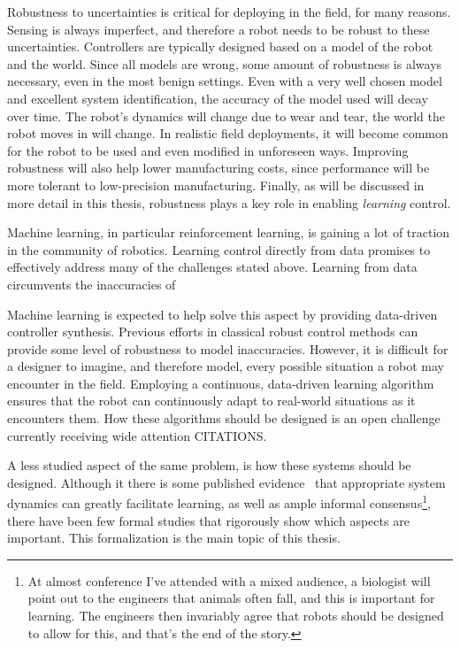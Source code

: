 Robustness to uncertainties is critical for deploying in the field, for many reasons.
Sensing is always imperfect, and therefore a robot needs to be robust to these uncertainties.
Controllers are typically designed based on a model of the robot and the world. Since all models are wrong, some amount of robustness is always necessary, even in the most benign settings.
Even with a very well chosen model and excellent system identification, the accuracy of the model used will decay over time.
The robot's dynamics will change due to wear and tear, the world the robot moves in will change.
In realistic field deployments, it will become common for the robot to be used and even modified in unforeseen ways.
Improving robustness will also help lower manufacturing costs, since performance will be more tolerant to low-precision manufacturing.
Finally, as will be discussed in more detail in this thesis, robustness plays a key role in enabling \emph{learning} control.


\par

Machine learning, in particular reinforcement learning, is gaining a lot of traction in the community of robotics. Learning control directly from data promises to effectively address many of the challenges stated above.
Learning from data circumvents the inaccuracies of 

Machine learning is expected to help solve this aspect by providing data-driven controller synthesis. Previous efforts in classical robust control methods can provide some level of robustness to model inaccuracies. However, it is difficult for a designer to imagine, and therefore model, every possible situation a robot may encounter in the field. Employing a continuous, data-driven learning algorithm ensures that the robot can continuously adapt to real-world situations as it encounters them. How these algorithms should be designed is an open challenge currently receiving wide attention CITATIONS. \par

A less studied aspect of the same problem, is how these systems should be designed. Although it there is some published evidence~\cite{tedrake2005learning, randlov2000shaping} that appropriate system dynamics can greatly facilitate learning, as well as ample informal consensus\footnote{At almost conference I've attended with a mixed audience, a biologist will point out to the engineers that animals often fall, and this is important for learning. The engineers then invariably agree that robots should be designed to allow for this, and that's the end of the story.}, there have been few formal studies that rigorously show which aspects are important. This formalization is the main topic of this thesis.

